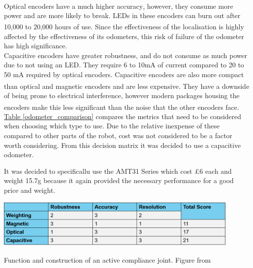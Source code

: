 \documentclass[11pt]{article}		%
\newcommand{\supercite}[1]{\textsuperscript{\cite{#1}}}		%
\newcommand{\tableref}[1]{\hyperref[#1]{Table \ref*{#1}}}     %
\begin{document}
	        \\
	        Optical encoders have a much higher accuracy\supercite{Encoders}, however, they consume more power and are more likely to break. LEDs in these encoders can burn out after 10,000 to 20,000 hours of use.\supercite{Encoders} 
	        Since the effectiveness of the localisation is highly affected by  the effectiveness of its odometers, this risk of failure of the odometer has high significance.
	        \\
	        Capacitive encoders have greater robustness, and do not consume as much power due to not using an LED. 
	        They require 6 to 10mA of current compared to 20 to 50 mA required by optical encoders.
	        Capacitive encoders are also more compact than optical and magnetic encoders and are less expensive\supercite{Encoders}. 
	        They have a downside of being prone to electrical interference, however modern packages housing the encoders make this less significant than the noise that the other encoders face.\supercite{Encoders}
	        \\
	        \tableref{odometer_comparison} compares the metrics that need to be considered when choosing which type to use. 
	        Due to the relative inexpense of these compared to other parts of the robot, cost was not considered to be a factor worth considering. 
	        From this decision matrix it was decided to use a capacitive odometer. 
	        
	        It was decided to specificallu use the AMT31 Series which cost £6 each and weight 15.7g because it again provided the necessary performance for a good price and weight.
	        
	        \begin{table}[h]
						\centering
							\includegraphics[width=0.9\textwidth]{Encoder comparison table}
							\caption{Function and construction of an active compliance joint. Figure from \cite{park2010normal}}
							\label{odometer_comparison}
					\end{table}
					
\end{document}
